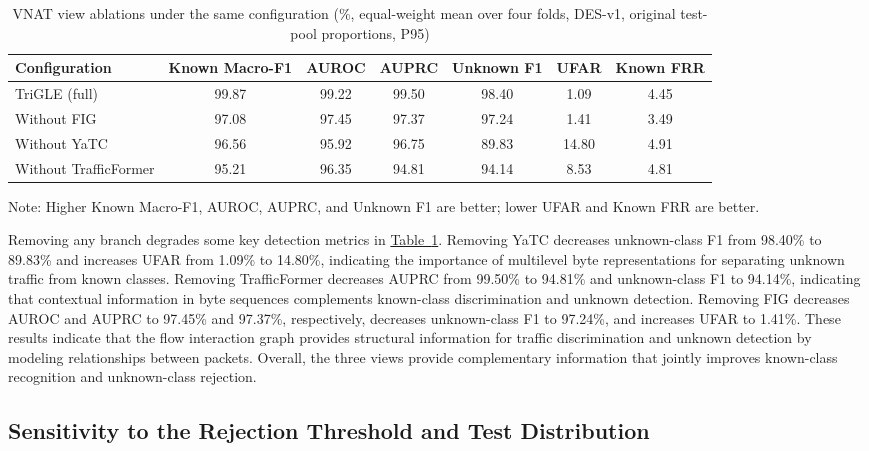 \begin{table}[H]
\centering
\begingroup
\renewcommand{\thetable}{4-10}
\caption{VNAT view ablations under the same configuration (\%, equal-weight mean over four folds, DES-v1, original test-pool proportions, P95)}\label{tab:source-9}
\fontsize{6.5}{8}\selectfont
\setlength{\tabcolsep}{1pt}
\begin{tabular}{@{}lcccccc@{}}
\hline
Configuration & Known Macro-F1 & AUROC & AUPRC & Unknown F1 & UFAR & Known FRR \\
\hline
TriGLE (full) & 99.87 & 99.22 & 99.50 & 98.40 & 1.09 & 4.45 \\
Without FIG & 97.08 & 97.45 & 97.37 & 97.24 & 1.41 & 3.49 \\
Without YaTC & 96.56 & 95.92 & 96.75 & 89.83 & 14.80 & 4.91 \\
Without TrafficFormer & 95.21 & 96.35 & 94.81 & 94.14 & 8.53 & 4.81 \\
\hline
\end{tabular}
\par\smallskip\parbox{\columnwidth}{\fontsize{7}{8}\selectfont Note: Higher Known Macro-F1, AUROC, AUPRC, and Unknown F1 are better; lower UFAR and Known FRR are better.}
\endgroup
\end{table}


Removing any branch degrades some key detection metrics in \hyperref[tab:source-9]{Table~\ref*{tab:source-9}}. Removing YaTC decreases unknown-class F1 from 98.40\% to 89.83\% and increases UFAR from 1.09\% to 14.80\%, indicating the importance of multilevel byte representations for separating unknown traffic from known classes. Removing TrafficFormer decreases AUPRC from 99.50\% to 94.81\% and unknown-class F1 to 94.14\%, indicating that contextual information in byte sequences complements known-class discrimination and unknown detection. Removing FIG decreases AUROC and AUPRC to 97.45\% and 97.37\%, respectively, decreases unknown-class F1 to 97.24\%, and increases UFAR to 1.41\%. These results indicate that the flow interaction graph provides structural information for traffic discrimination and unknown detection by modeling relationships between packets. Overall, the three views provide complementary information that jointly improves known-class recognition and unknown-class rejection.

\subsection{Sensitivity to the Rejection Threshold and Test Distribution}\label{sec:threshold-distribution}

